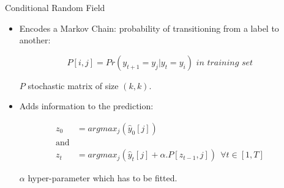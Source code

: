 \documentclass[final]{beamer}
\newlength{\onecolwid}
\newlength{\twocolwid}
\begin{document}
\begin{frame}[t]
\begin{columns}[t]
\begin{column}{\twocolwid}
\begin{columns}[t,totalwidth=\twocolwid]
\begin{column}{\onecolwid}
\begin{block}{Conditional Random Field}
  \begin{itemize}
  \item Encodes a Markov Chain: probability of transitioning from a label to another:

  \vspace{5mm}

  \[
  P[i, j] = Pr(y_{t+1} = y_j | y_{t} =y_i) \textit{ in training set}
  \]

  \vspace{5mm}

  $P$ stochastic matrix of size $(k,k)$.

  \vspace{10mm}

  \item Adds information to the prediction:

  \vspace{5mm}

  \begin{align*}
  z_0 &= argmax_j(\hat{y}_0[j])
  \\
  \text{and}&
  \\
  z_t &= argmax_j(\hat{y}_t[j] + \alpha.P[z_{t-1},  j]) \ \ \forall t \in [1, T]
  \end{align*}

  \vspace{5mm}

  $\alpha$ hyper-parameter which has to be fitted.

  \end{itemize}

\end{block}


\end{column} %

\begin{column}{\onecolwid}\vspace{-.6in} %



\end{column}
\end{columns}
\end{column}
\end{columns}
\end{frame}
\end{document}
